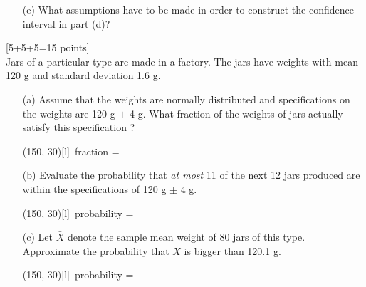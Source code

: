 \documentclass[11pt]{article}
\begin{document}
{\begin{enumerate}


 \hfill \framebox(400, 30)[l]{\, conf. interval = }

\vskip 10cm
\item[(e)] What assumptions have to be made in order to construct the
confidence interval in part (d)?


\end{enumerate}


\newpage

\hfill[5+5+5=15 points] \\
%
Jars of a particular type are made in a factory. The jars have weights with mean 120 g and standard deviation 1.6 g.
%
\begin{enumerate}
%
\item[(a)] Assume that the weights are normally distributed 
 and specifications on the
weights are 120 g $\pm$ 4 g.  What  fraction of the weights of jars actually satisfy this specification ?


 \hfill
\framebox(150, 30)[l]{\, 
fraction = \hspace{3cm}}
\vskip 6cm


\item[(b)] Evaluate the probability that \emph{at most} 11 of the next 12 jars produced are within the
specifications of 120 g $\pm $ 4 g.

 \hfill
\framebox(150, 30)[l]{\, probability = \hspace{3cm}}

\newpage
\item[(c)] Let $\bar X$ denote the sample mean weight of 80 jars
of this type. Approximate the probability that $\bar X$ is bigger than 120.1 g.



 \hfill
\framebox(150, 30)[l]{\, probability = \hspace{3cm}}

\end{enumerate}

\newpage

}
\end{document}

